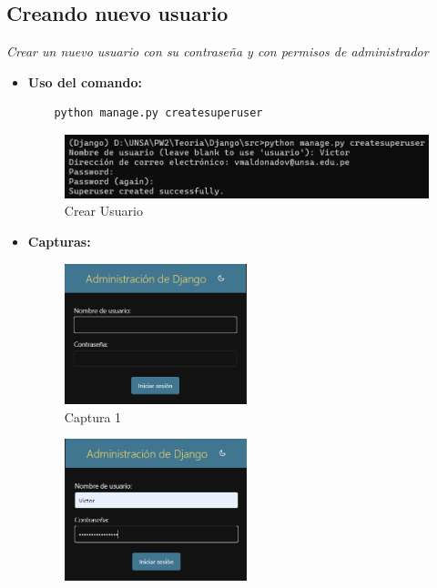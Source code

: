 \documentclass{article}
\begin{document}
  \subsection{Creando nuevo usuario}
  \textit{Crear un nuevo usuario con su contraseña y con permisos de administrador}
  \begin{itemize}
    \item \textbf{Uso del comando: }
    \begin{lstlisting}
    python manage.py createsuperuser
    \end{lstlisting}
    \begin{figure}[H]
      \centering
      \includegraphics[width=1\textwidth, keepaspectratio]{img/nuevoUsuario.png}
      \caption{Crear Usuario}
    \end{figure}
    \item \textbf{Capturas: }
    \begin{figure}[H]
      \centering
      \includegraphics[width=0.5\textwidth, keepaspectratio]{img/admin.png}
      \caption{Captura 1}
    \end{figure}
    \newpage
    \begin{figure}[H]
      \centering
      \includegraphics[width=0.5\textwidth, keepaspectratio]{img/admin1.png}

\end{figure}
\end{itemize}
\end{document}
